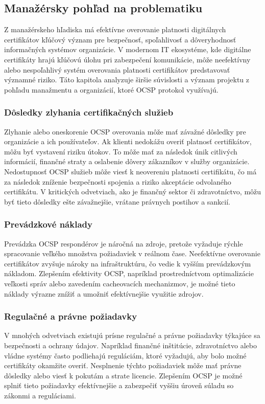 \documentclass[12pt, twoside]{book}
\begin{document}
\subsection{Manažérsky pohľad na problematiku}
Z manažérskeho hľadiska má efektívne overovanie platnosti digitálnych certifikátov kľúčový význam pre bezpečnosť, spoľahlivosť a dôveryhodnosť informačných systémov organizácie. V modernom IT ekosystéme, kde digitálne certifikáty hrajú kľúčovú úlohu pri zabezpečení komunikácie, môže neefektívny alebo nespoľahlivý systém overovania platnosti certifikátov predstavovať významné riziko. Táto kapitola analyzuje širšie súvislosti a význam projektu z pohľadu manažmentu a organizácií, ktoré OCSP protokol využívajú.

\subsubsection{Dôsledky zlyhania certifikačných služieb}
Zlyhanie alebo oneskorenie OCSP overovania môže mať závažné dôsledky pre organizácie a ich používateľov. Ak klienti nedokážu overiť platnosť certifikátov, môžu byť vystavení riziku útokov. To môže mať za následok únik citlivých informácií, finančné straty a oslabenie dôvery zákazníkov v služby organizácie. Nedostupnosť OCSP služieb môže viesť k neovereniu platnosti certifikátu, čo má za následok zníženie bezpečnosti spojenia a riziko akceptácie odvolaného certifikátu. V kritických odvetviach, ako je finančný sektor či zdravotníctvo, môžu byť tieto dôsledky ešte závažnejšie, vrátane právnych postihov a sankcií.

\subsubsection{Prevádzkové náklady}
Prevádzka OCSP respondérov je náročná na zdroje, pretože vyžaduje rýchle spracovanie veľkého množstva požiadaviek v reálnom čase. Neefektívne overovanie certifikátov zvyšuje nároky na infraštruktúru, čo vedie k vyšším prevádzkovým nákladom. Zlepšením efektivity OCSP, napríklad prostredníctvom optimalizácie veľkosti správ alebo zavedením cacheovacích mechanizmov, je možné tieto náklady výrazne znížiť a umožniť efektívnejšie využitie zdrojov.

\subsubsection{Regulačné a právne požiadavky}
V mnohých odvetviach existujú prísne regulačné a právne požiadavky týkajúce sa bezpečnosti a ochrany údajov. Napríklad finančné inštitúcie, zdravotníctvo alebo vládne systémy často podliehajú reguláciám, ktoré vyžadujú, aby bolo možné certifikáty okamžite overiť. Nesplnenie týchto požiadaviek môže mať právne dôsledky alebo viesť k pokutám a strate licencie. Zlepšením OCSP je možné splniť tieto požiadavky efektívnejšie a zabezpečiť vyššiu úroveň súladu so zákonmi a reguláciami.
\end{document}
